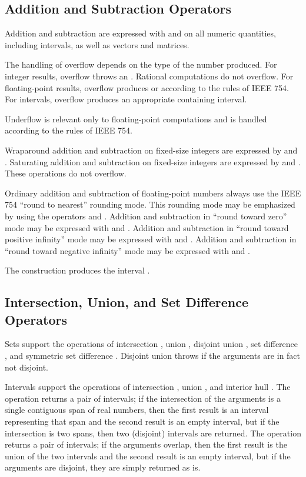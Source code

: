 \subsection{Addition and Subtraction Operators}

Addition and subtraction are expressed with \EXP{+} and \EXP{-} on all numeric quantities,
including intervals, as well as vectors and matrices.

The handling of overflow depends on the type of the number produced.
For integer results, overflow throws an .
Rational computations do not overflow.
For floating-point results, overflow produces \EXP{+\infty} or \EXP{-\infty}
according to the rules of IEEE 754.
For intervals, overflow produces an appropriate containing interval.

Underflow is relevant only to floating-point computations and is handled
according to the rules of IEEE 754.

Wraparound addition and subtraction on fixed-size integers are
expressed by \EXP{\dotplus} and \EXP{\dotminus}.
Saturating addition and subtraction on fixed-size integers are
expressed by \EXP{\boxplus} and \EXP{\boxminus}.
These operations do not overflow.

Ordinary addition and subtraction of floating-point numbers always
use the IEEE 754 ``round to nearest'' rounding mode.  This rounding
mode may be emphasized by using the operators \EXP{\oplus}
and \EXP{\ominus}.  Addition and subtraction in ``round toward zero''
mode may be expressed with \EXP{\boxplus} and \EXP{\boxminus}.
Addition and subtraction in ``round toward positive infinity''
mode may be expressed with \EXP{\upplus} and \EXP{\upminus}.
Addition and subtraction in ``round toward negative infinity''
mode may be expressed with \EXP{\downplus} and \EXP{\downminus}.

The construction  produces the interval .

\subsection{Intersection, Union, and Set Difference Operators}

Sets support the operations of intersection \EXP{\cap}, union
\EXP{\cup}, disjoint union \EXP{\uplus},
set difference \EXP{\setminus}, and symmetric set difference
\EXP{\ominus}.  Disjoint union
throws  if the arguments are in fact not disjoint.

Intervals support the operations of intersection \EXP{\cap}, union
\EXP{\cup}, and interior hull \EXP{\underline{\union}}.
The operation \EXP{\Cap} returns a pair of intervals; if the intersection of
the arguments is a single contiguous span of real numbers, then the first result is an
interval representing that span and the second result is an empty interval,
but if the intersection is two spans, then two (disjoint) intervals are returned.
The operation \EXP{\Cup} returns a pair of intervals; if the arguments overlap, then
the first result is the union of the two intervals and the second result is an empty interval,
but if the arguments are disjoint, they are simply returned as is.

